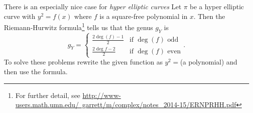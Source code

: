 \documentclass[10pt]{article}
\begin{document}
There is an especially nice case for \emph{hyper elliptic curves}
Let $\pi$ be a hyper elliptic curve with $y^2 = f(x)$ where $f$ is a square-free polynomial in $x$. Then the Riemann-Hurwitz formula\footnote{For further detail, see \href{PG's notes}{http://www-users.math.umn.edu/~garrett/m/complex/notes\_2014-15/ERNPRHH.pdf}} tells us that the genus $g_Y$ is 
\[g_Y  = \begin{cases} \frac{2\deg(f)-1}{2} & \text{if } \deg(f) \text{ odd} \\ \frac{2\deg{f}-2}{2} & \text{if } \deg(f) \text{ even}  \end{cases}. \]
To solve these problems rewrite the given function as $y^2 = $(a polynomial) and then use the formula.
\end{document}
